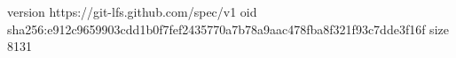 version https://git-lfs.github.com/spec/v1
oid sha256:e912c9659903cdd1b0f7fef2435770a7b78a9aac478fba8f321f93c7dde3f16f
size 8131
